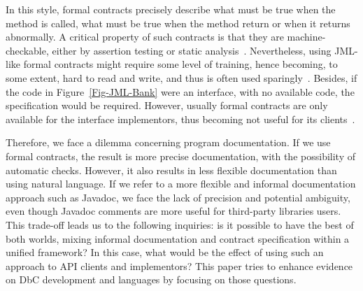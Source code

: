 In this style, formal contracts precisely describe what must be true when the method is called, what must be true when the method return or when it returns abnormally. A critical property of such contracts is that they are machine-checkable, either by assertion testing or static analysis~\cite{Chalin06}.
Nevertheless, using JML-like formal contracts might require some level of training, hence becoming, to some extent, hard to read and write, and thus is often used sparingly~\cite{Chalin06,Polikarpova-etal09,typeContracts}.
Besides, if the code in Figure~\ref{Fig-JML-Bank} were an interface, with no available code, the specification would be required. However, usually formal contracts are only available for the interface implementors, thus becoming not useful for its clients~\cite{Parnas2011}.


Therefore, we face a dilemma concerning program documentation. If we use formal contracts, the result is more precise documentation, with the possibility of automatic checks. However, it also results in less flexible documentation than using natural language.
If we refer to a more flexible and informal documentation approach such as Javadoc, we face the lack of precision and potential ambiguity, even though Javadoc comments are more useful for third-party libraries users. This trade-off leads us to the following inquiries: is it possible to have the best of both worlds, mixing informal documentation and contract specification within a unified framework? In this case, what would be the effect of using such an approach to API clients and implementors? This paper tries to enhance evidence on DbC development and languages by focusing on those questions.

